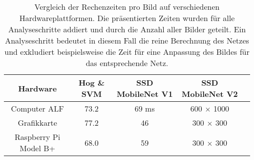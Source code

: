 \begin{table}[H]
	\caption{Vergleich der Rechenzeiten pro Bild auf verschiedenen Hardwareplattformen. Die präsentierten Zeiten wurden für alle Analyseschritte addiert und durch die Anzahl aller Bilder geteilt. Ein Analyseschritt bedeutet in diesem Fall die reine Berechnung des Netzes und exkludiert beispielsweise die Zeit für eine Anpassung des Bildes für das entsprechende Netz.  }
	\begin{center}
		\begin{tabular}{|c|c|c|c|c|}
			\hline
			\multicolumn{1}{|c|}{Hardware} & \multicolumn{1}{c|}{Hog \& SVM} & \multicolumn{1}{c|}{SSD MobileNet V1} & \multicolumn{1}{c|}{SSD MobileNet V2} \\ \hline
			Computer ALF	&73.2 	&69 ms		& 600 $\times$ 1000 	 \\
			Grafikkarte			&77.2 	&46		& 	300 $\times$ 300  	 \\
			Raspberry Pi Model B+			&68.0	&59		& 300 $\times$ 300 \\
			
			\hline
		\end{tabular}
	\end{center}

	\label{fig: mobilessdtab}
\end{table}